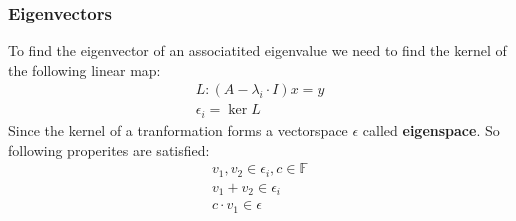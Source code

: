 \subsubsection{Eigenvectors}
To find the eigenvector of an associatited eigenvalue we need to find the kernel of the following linear map:
\begin{align*}
    L:  (A - \lambda_i \cdot I) x = y \\
    \epsilon_i = \ker L
\end{align*}
Since the kernel of a tranformation forms a vectorspace  \( \epsilon \) called \textbf{eigenspace}. So following properites are satisfied:
\begin{align*}
    v_1, v_2 \in \epsilon_i, c \in \mathbb{F} \\
    v_1 + v_2 \in \epsilon_i                  \\
    c \cdot v_1 \in \epsilon                  \\
\end{align*}
